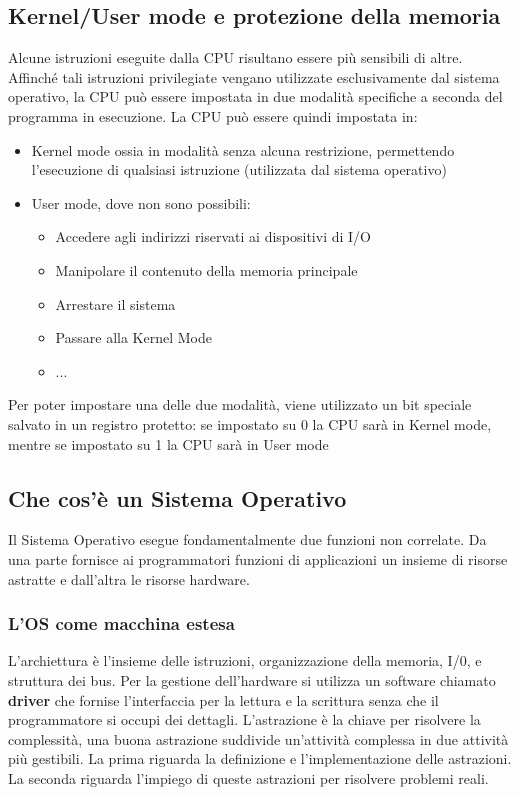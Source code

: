 \documentclass{article}
\begin{document}
\subsection{Kernel/User mode e protezione della memoria}
Alcune istruzioni eseguite dalla CPU risultano essere più sensibili di altre. Affinché tali istruzioni privilegiate vengano utilizzate esclusivamente dal sistema operativo, la CPU può essere impostata in due modalità specifiche a seconda del programma in esecuzione.
La CPU può essere quindi impostata in:
\begin{itemize}
    \item Kernel mode ossia in modalità senza alcuna restrizione, permettendo l'esecuzione di qualsiasi istruzione (utilizzata dal sistema operativo)
    \item User mode, dove non sono possibili:
    \begin{itemize}
        \item Accedere agli indirizzi riservati ai dispositivi di I/O 
        \item Manipolare il contenuto della memoria principale
        \item Arrestare il sistema
        \item Passare alla Kernel Mode
        \item ...
    \end{itemize}

\end{itemize}
Per poter impostare una delle due modalità, viene utilizzato un bit speciale salvato in un registro protetto: se impostato su 0 la CPU sarà in Kernel mode, mentre se impostato su 1 la CPU sarà in User mode
\subsection{Che cos'è un Sistema Operativo}

Il Sistema Operativo esegue fondamentalmente due funzioni non correlate. Da una parte fornisce ai programmatori funzioni di applicazioni un insieme di risorse astratte e dall'altra le risorse hardware.
\subsubsection{L'OS come macchina estesa}

L'archiettura è l'insieme delle istruzioni, organizzazione della memoria, I/0, e struttura dei bus. Per la gestione dell'hardware si utilizza un software chiamato \textbf{driver} che fornise l'interfaccia per la lettura e la scrittura senza che il programmatore si occupi dei dettagli.
L'astrazione è la chiave per risolvere la complessità, una buona astrazione suddivide un'attività complessa in due attività più gestibili. La prima riguarda la definizione e l'implementazione delle astrazioni. La seconda riguarda l'impiego di queste astrazioni per risolvere problemi reali.
\end{document}
